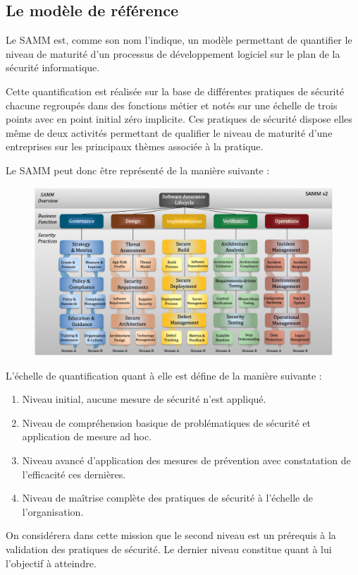 \subsection{Le modèle de référence}

Le \ac{SAMM} est, comme son nom l'indique, un modèle permettant de quantifier le niveau de maturité d'un processus de 
développement logiciel sur le plan de la sécurité informatique. 

Cette quantification est réalisée sur la base de différentes pratiques de sécurité chacune regroupés dans des fonctions 
métier et notés sur une échelle de trois points avec en point initial zéro implicite. 
\newline Ces pratiques de sécurité dispose elles même de deux activités permettant de qualifier le niveau de maturité 
d'une entreprises sur les principaux thèmes associée à la pratique.

Le \ac{SAMM} peut donc être représenté de la manière suivante :

\begin{figure}[h]
    \centering
    \includegraphics[width=1\linewidth]{resources/img/Samm_v2.png}
    \label{fig:samm-rep}
\end{figure}

\newpage

L'échelle de quantification quant à elle est défine de la manière suivante : 
\begin{enumerate}
    \item Niveau initial, aucune mesure de sécurité n'est appliqué.
    \item Niveau de compréhension basique de problématiques de sécurité et application de mesure ad hoc.
    \item Niveau avancé d'application des mesures de prévention avec constatation de l'efficacité ces dernières.
    \item Niveau de maîtrise complète des pratiques de sécurité à l'échelle de l'organisation.
\end{enumerate}
On considérera dans cette mission que le second niveau est un prérequis à la validation des pratiques de sécurité.
Le dernier niveau constitue quant à lui l'objectif à atteindre.

